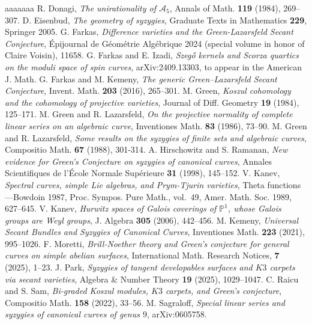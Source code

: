 \documentclass[11pt]{amsart}
\theoremstyle{definition}
\begin{document}
\begin{thebibliography}{aaaaaaa}
 R. Donagi, {\em{The unirationality of $\mathcal{A}_5$}},
Annals of Math. \textbf{119} (1984), 269--307.
 D. Eisenbud, {\em{The geometry of syzygies}}, Graduate Texts in Mathematics \textbf{229}, Springer 2005.
 G. Farkas, {\em{Difference varieties and the Green-Lazarsfeld Secant Conjecture}},  \'{E}pijournal de G\'{e}om\'{e}trie Alg\'{e}brique 2024 (special volume in honor of Claire Voisin), 11658.  
 G. Farkas and E. Izadi, {\em{Szeg\H{o} kernels and Scorza quartics on the moduli space of spin curves}}, arXiv:2409.13303, to appear in the American J. Math.
 G. Farkas and M. Kemeny, {\em The generic Green–Lazarsfeld Secant Conjecture}, Invent. Math. \textbf{203} (2016), 265–301.
 M. Green, {\em{Koszul cohomology and the cohomology of projective varieties}}, Journal of Diff. Geometry \textbf{19} (1984), 125--171.
 M. Green and R. Lazarsfeld, {\em{On the projective normality of complete linear series on an algebraic curve}}, Inventiones Math. \textbf{83} (1986), 73--90.
 M. Green and R. Lazarsfeld, {\em{Some results on the syzygies of finite sets and algebraic curves}}, Compositio Math. \textbf{67} (1988), 301-314.
 A. Hirschowitz and S. Ramanan, {\em{New evidence for Green's Conjecture on syzygies of canonical curves}}, Annales Scientifiques de l'\'Ecole Normale Sup\'erieure \textbf{31} (1998), 145--152.
V. Kanev, \emph{Spectral curves, simple {L}ie algebras, and {P}rym-{T}jurin
  varieties}, Theta functions---{B}owdoin 1987, Proc. Sympos. Pure Math., vol.~49, Amer. Math. Soc.
  1989, 627--645.
V. Kanev, \emph{Hurwitz spaces of {G}alois coverings of {${\mathbb P}^1$}, whose
  {G}alois groups are {W}eyl groups}, J. Algebra \textbf{305} (2006),
  442--456. 
 M. Kemeny, {\em{Universal Secant Bundles and Syzygies of Canonical Curves}}, Inventiones Math. \textbf{223} (2021), 995--1026.
 F. Moretti, {\em{Brill-Noether theory and Green's conjecture for general curves on simple abelian surfaces}}, International Math. Research Notices, \textbf{7} (2025), 1--23.
 J. Park, {\em{Syzygies of tangent developables surfaces and $K3$ carpets via secant varieties}}, Algebra \& Number Theory \textbf{19} (2025), 1029--1047.
 C. Raicu and S. Sam, {\em{Bi-graded Koszul modules, $K3$ carpets, and Green's conjecture}}, Compositio Math. \textbf{158} (2022), 33--56.
 M. Sagraloff, {\em{Special linear series and syzygies of canonical curves of genus $9$}}, arXiv:0605758.

\end{thebibliography}
\end{document}
